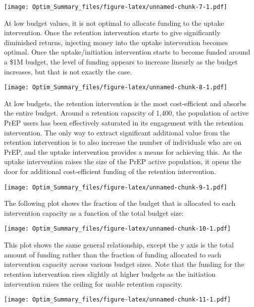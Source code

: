 \documentclass[
]{article}
\begin{document}
\texttt{[image: Optim\_Summary\_files/figure-latex/unnamed-chunk-7-1.pdf]}

At low budget values, it is not optimal to allocate funding to the
uptake intervention. Once the retention intervention starts to give
significantly diminished returns, injecting money into the uptake
intervention becomes optimal. Once the uptake/initiation intervention
starts to become funded around a \$1M budget, the level of funding
appears to increase linearly as the budget increases, but that is not
exactly the case.

\texttt{[image: Optim\_Summary\_files/figure-latex/unnamed-chunk-8-1.pdf]}

At low budgets, the retention intervention is the most cost-efficient
and absorbs the entire budget. Around a retention capacity of 1,400, the
population of active PrEP users has been effectively saturated in its
engagement with the retention intervention. The only way to extract
significant additional value from the retention intervention is to also
increase the number of individuals who are on PrEP, and the uptake
intervention provides a means for achieving this. As the uptake
intervention raises the size of the PrEP active population, it opens the
door for additional cost-efficient funding of the retention
intervention.

\texttt{[image: Optim\_Summary\_files/figure-latex/unnamed-chunk-9-1.pdf]}

The following plot shows the fraction of the budget that is allocated to
each intervention capacity as a function of the total budget size:

\texttt{[image: Optim\_Summary\_files/figure-latex/unnamed-chunk-10-1.pdf]}

This plot shows the same general relationship, except the y axis is the
total amount of funding rather than the fraction of funding allocated to
each intervention capacity across various budget sizes. Note that the
funding for the retention intervention rises slightly at higher budgets
as the initiation intervention raises the ceiling for usable retention
capacity.

\texttt{[image: Optim\_Summary\_files/figure-latex/unnamed-chunk-11-1.pdf]}
\end{document}
